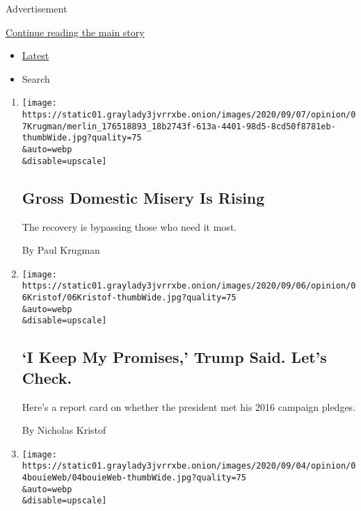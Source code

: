 Advertisement

\protect\hyperlink{after-mid1}{Continue reading the main story}

\begin{itemize}
\tightlist
\item
  \protect\hyperlink{stream-panel}{Latest}
\item
  Search
\end{itemize}

\begin{enumerate}
\def\labelenumi{\arabic{enumi}.}
\item
  \href{/2020/09/07/opinion/trump-economy-jobs.html}{}

  \texttt{[image: https://static01.graylady3jvrrxbe.onion/images/2020/09/07/opinion/07Krugman/merlin\_176518893\_18b2743f-613a-4401-98d5-8cd50f8781eb-thumbWide.jpg?quality=75\\\&auto=webp\\\&disable=upscale]}

  \hypertarget{gross-domestic-misery-is-rising}{%
  \subsection{Gross Domestic Misery Is
  Rising}\label{gross-domestic-misery-is-rising}}

  The recovery is bypassing those who need it most.

  By Paul Krugman
\item
  \href{/2020/09/05/opinion/sunday/trump-promises-check.html}{}

  \texttt{[image: https://static01.graylady3jvrrxbe.onion/images/2020/09/06/opinion/06Kristof/06Kristof-thumbWide.jpg?quality=75\\\&auto=webp\\\&disable=upscale]}

  \hypertarget{i-keep-my-promises-trump-said-lets-check}{%
  \subsection{`I Keep My Promises,' Trump Said. Let's
  Check.}\label{i-keep-my-promises-trump-said-lets-check}}

  Here's a report card on whether the president met his 2016 campaign
  pledges.

  By Nicholas Kristof
\item
  \href{/2020/09/04/opinion/the-conspiracist-in-chief-will-save-us-all.html}{}

  \texttt{[image: https://static01.graylady3jvrrxbe.onion/images/2020/09/04/opinion/04bouieWeb/04bouieWeb-thumbWide.jpg?quality=75\\\&auto=webp\\\&disable=upscale]}


\end{enumerate}
